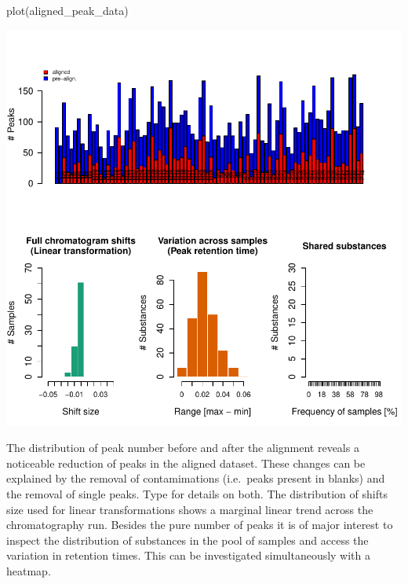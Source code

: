\begin{Schunk}
\begin{Sinput}
plot(aligned_peak_data)
\end{Sinput}

\includegraphics{ottensmann-stoffel-hoffman_files/figure-latex/unnamed-chunk-7-1} \end{Schunk}

The distribution of peak number before and after the alignment reveals a
noticeable reduction of peaks in the aligned dataset. These changes can
be explained by the removal of contamimations (i.e.~peaks present in
blanks) and the removal of single peaks. Type
 for details on both. The distribution of
shifts size used for linear transformations shows a marginal linear
trend across the chromatography run. Besides the pure number of peaks it
is of major interest to inspect the distribution of substances in the
pool of samples and access the variation in retention times. This can be
investigated simultaneously with a heatmap.

